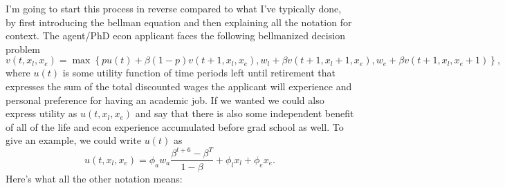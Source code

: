 \documentclass[11pt,english]{article}
\begin{document}
I'm going to start this process in reverse compared to what I've typically done, by first introducing the bellman equation and then explaining all the notation for context. The agent/PhD econ applicant faces the following bellmanized decision problem $$v(t, x_{l}, x_{e}) = \max\left\{p  u(t) + \beta(1-p)v(t+1, x_{l}, x_{e}), w_{l} + \beta v(t+1, x_{l}+1, x_{e}), w_{e} + \beta v(t+1, x_{l}, x_{e}+1)\right\},$$ where $u(t)$ is some utility function of time periods left until retirement that expresses the sum of the total discounted wages the applicant will experience and personal preference for having an academic job. If we wanted we could also express utility as $u(t, x_l, x_e)$ and say that there is also some independent benefit of all of the life and econ experience accumulated before grad school as well. To give an example, we could write $u(t)$ as $$u(t, x_l, x_e) = \phi_aw_a\frac{\beta^{t+6} - \beta^T}{1-\beta} + \phi_l x_l + \phi_e x_e.$$
\noindent Here's what all the other notation means:
\end{document}
